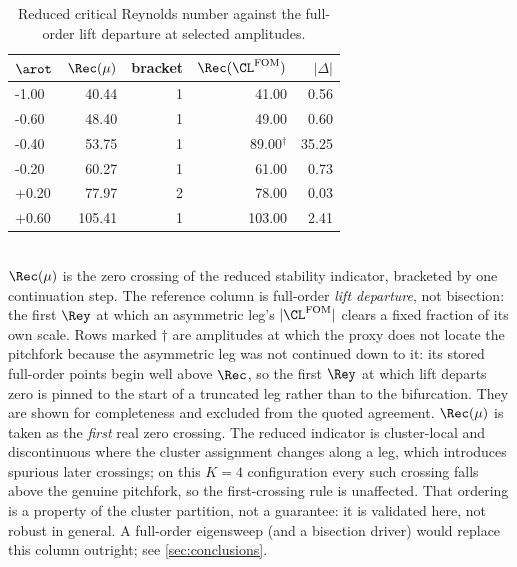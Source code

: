 \begin{table}[tb]
  \centering
  \caption{Reduced critical Reynolds number against the full-order lift departure at selected amplitudes.}
  \label{tab:critcurve}
  \begin{tabular}{lrrrr}
    \toprule
    $\arot$ & $\Rec(\mu)$ & bracket & $\Rec(\CL^{\mathrm{FOM}})$ & $|\Delta|$ \\
    \midrule
    -1.00 & 40.44 & 1 & 41.00 & 0.56 \\
    -0.60 & 48.40 & 1 & 49.00 & 0.60 \\
    -0.40 & 53.75 & 1 & 89.00$^{\dagger}$ & 35.25 \\
    -0.20 & 60.27 & 1 & 61.00 & 0.73 \\
    +0.20 & 77.97 & 2 & 78.00 & 0.03 \\
    +0.60 & 105.41 & 1 & 103.00 & 2.41 \\
    \bottomrule
  \end{tabular}
  \\[2pt] \footnotesize $\Rec(\mu)$ is the zero crossing of the reduced stability indicator, bracketed by one continuation step. The reference column is full-order \emph{lift departure}, not bisection: the first $\Rey$ at which an asymmetric leg's $|\CL^{\mathrm{FOM}}|$ clears a fixed fraction of its own scale. Rows marked $\dagger$ are amplitudes at which the proxy does not locate the pitchfork because the asymmetric leg was not continued down to it: its stored full-order points begin well above $\Rec$, so the first $\Rey$ at which lift departs zero is pinned to the start of a truncated leg rather than to the bifurcation. They are shown for completeness and excluded from the quoted agreement. $\Rec(\mu)$ is taken as the \emph{first} real zero crossing. The reduced indicator is cluster-local and discontinuous where the cluster assignment changes along a leg, which introduces spurious later crossings; on this $K=4$ configuration every such crossing falls above the genuine pitchfork, so the first-crossing rule is unaffected. That ordering is a property of the cluster partition, not a guarantee: it is validated here, not robust in general. A full-order eigensweep (and a bisection driver) would replace this column outright; see \cref{sec:conclusions}.
\end{table}
